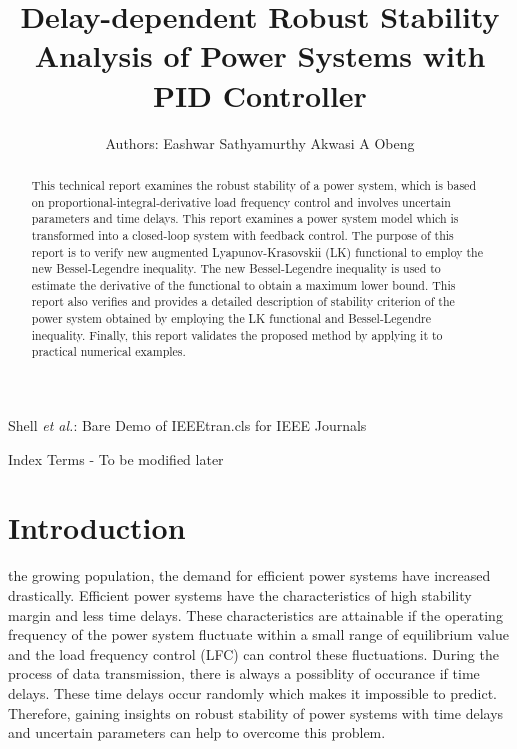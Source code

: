 \documentclass[journal]{IEEEtran}
\begin{document}
\title{Delay-dependent Robust Stability Analysis of Power Systems with PID Controller}

\author{ Authors: Eashwar Sathyamurthy  Akwasi A Obeng}
        
{Shell \MakeLowercase{\textit{et al.}}: Bare Demo of IEEEtran.cls for IEEE Journals}

\maketitle

\begin{abstract}
  This technical report examines the robust stability of a power system, which is based on proportional-integral-derivative load
frequency control and involves uncertain parameters and time delays. This report examines a power system model which  is transformed into a closed-loop system with feedback control. The purpose of this report is to verify new augmented Lyapunov-Krasovskii (LK)
functional to employ the new Bessel-Legendre inequality. The new Bessel-Legendre inequality is used to estimate the derivative of the functional to obtain
a maximum lower bound. This report also verifies and provides a detailed description of stability criterion of the power system obtained by employing the LK functional and Bessel-Legendre inequality. Finally,
this report validates the proposed method by applying it to practical numerical examples.
\end{abstract}

\begin{IEEEkeywords}
  Index Terms - To be modified later
\end{IEEEkeywords}

\section{Introduction}

 the growing population, the demand for efficient power systems have increased drastically. Efficient power systems have the characteristics of high stability margin and less time delays. These characteristics are attainable if the operating frequency of the power system fluctuate within a small range of equilibrium value and the load frequency control (LFC) can control these fluctuations. During the process of data transmission, there is always a possiblity of occurance if time delays. These time delays occur randomly which makes it impossible to predict.  Therefore, gaining insights on robust stability of power systems with time delays and uncertain parameters can help to overcome this problem. \\
\end{document}
